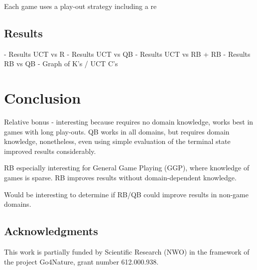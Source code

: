 \documentclass{ecai2010}
\begin{document}
Each game uses a play-out strategy including a re

\subsection{Results}
\label{subsec:results}
- Results UCT vs R
- Results UCT vs QB
- Results UCT vs RB + RB
- Results RB vs QB
- Graph of K's / UCT C's

\section{Conclusion}
Relative bonus - interesting because requires no domain knowledge, works best in games with long play-outs.
QB works in all domains, but requires domain knowledge, nonetheless, even using simple evaluation of the terminal state improved results considerably.

RB especially interesting for General Game Playing (GGP), where knowledge of games is sparse. RB improves results without domain-dependent knowledge.

Would be interesting to determine if RB/QB could improve results in non-game domains.

\subsection*{Acknowledgments}
This work is partially funded by Scientific Research (NWO) in the framework of the project Go4Nature, grant number 612.000.938.

\end{document}

